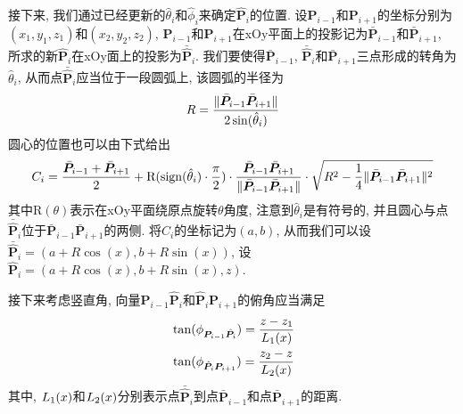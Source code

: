 \documentclass[utf8]{ctexart} %
\numberwithin{figure}{section}
\numberwithin{equation}{section}
\begin{document}
	 接下来, 我们通过已经更新的$\hat{\theta}_i$和$\hat{\phi}_i$来确定$\hat{\boldsymbol{P}}_i$的位置. 设$\boldsymbol{P}_{i-1}$和$\boldsymbol{P}_{i+1}$的坐标分别为$(x_1,y_1,z_1)$和$(x_2,y_2,z_2)$, $\boldsymbol{P}_{i-1}$和$\boldsymbol{P}_{i+1}$在xOy平面上的投影记为$\bar{\boldsymbol{P}}_{i-1}$和$\bar{\boldsymbol{P}}_{i+1}$, 所求的新$\hat{\boldsymbol{P}}_i$在xOy面上的投影为$\bar{\hat{\boldsymbol{P}}}_i$. 我们要使得$\bar{\boldsymbol{P}}_{i-1}$, $\bar{\hat{\boldsymbol{P}}}_i$和$\bar{\boldsymbol{P}}_{i+1}$三点形成的转角为$\hat{\theta}_i$, 从而点$\bar{\hat{\boldsymbol{P}}}_i$应当位于一段圆弧上, 该圆弧的半径为
	 \begin{equation}\label{R}
	 R = \frac{\Arrowvert\bar{\boldsymbol{P}}_{i-1}\bar{\boldsymbol{P}}_{i+1}\Arrowvert}{2\sin(\hat{\theta}_i)}
	 \end{equation}
	 圆心的位置也可以由下式给出
	 \begin{equation}\label{center}
	 C_i = \frac{\bar{\boldsymbol{P}}_{i-1}+\bar{\boldsymbol{P}}_{i+1}}2+\mathrm{R}(\mathrm{sign}(\hat{\theta}_i)\cdot\frac{\pi}2)\cdot\frac{\bar{\boldsymbol{P}}_{i-1}\bar{\boldsymbol{P}}_{i+1}}{\Arrowvert\bar{\boldsymbol{P}}_{i-1}\bar{\boldsymbol{P}}_{i+1}\Arrowvert}\cdot\sqrt{R^2-\frac14\Arrowvert\bar{\boldsymbol{P}}_{i-1}\bar{\boldsymbol{P}}_{i+1}\Arrowvert^2}
	 \end{equation}
	 其中$\mathrm{R}(\theta)$表示在xOy平面绕原点旋转$\theta$角度, 注意到$\hat{\theta}_i$是有符号的, 并且圆心与点$\bar{\hat{\boldsymbol{P}}}_i$位于$\bar{\boldsymbol{P}}_{i-1}\bar{\boldsymbol{P}}_{i+1}$的两侧. 将$C_i$的坐标记为$(a,b)$, 从而我们可以设$\bar{\hat{\boldsymbol{P}}}_i=(a+R\cos(x),b+R\sin(x))$, 设$\hat{\boldsymbol{P}}_i=(a+R\cos(x),b+R\sin(x),z)$. \par 
	 接下来考虑竖直角, 向量$\boldsymbol{P}_{i-1}\hat{\boldsymbol{P}}_i$和$\hat{\boldsymbol{P}}_i\boldsymbol{P}_{i+1}$的俯角应当满足
	 \begin{equation}
	 \begin{aligned}
	 &\tan(\phi_{\boldsymbol{P}_{i-1}\hat{\boldsymbol{P}}_i}) = \frac{z-z_1}{\boldmath{L}_1(x)}\\
	 &\tan(\phi_{\hat{\boldsymbol{P}}_i\boldsymbol{P}_{i+1}}) = \frac{z_2-z}{\boldmath{L}_2(x)}
	 \end{aligned}
	 \end{equation}
	 其中, $\boldmath{L}_1(x)$和$\boldmath{L}_2(x)$分别表示点$\bar{\hat{\boldsymbol{P}}}_i$到点$\bar{\boldsymbol{P}}_{i-1}$和点$\bar{\boldsymbol{P}}_{i+1}$的距离.
	 
\end{document}
